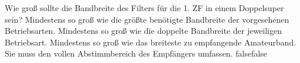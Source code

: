     {Wie groß sollte die Bandbreite des Filters für die 1. ZF in einem Doppelsuper sein?}
    {Mindestens so groß wie die größte benötigte Bandbreite der vorgesehenen Betriebsarten.}
    {Mindestens so groß wie die doppelte Bandbreite der jeweiligen Betriebsart.}
    {Mindestens so groß wie das breiteste zu empfangende Amateurband.}
    {Sie muss den vollen Abstimmbereich des Empfängers umfassen.}
    {false}{false}
